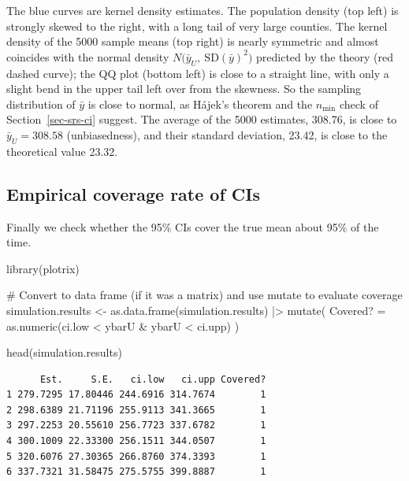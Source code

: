 \documentclass[
  letterpaper,
  DIV=11,
  numbers=noendperiod]{scrreprt}
\newenvironment{Shaded}{\begin{snugshade}}{\end{snugshade}}
\newcommand{\AttributeTok}[1]{\textcolor[rgb]{0.40,0.45,0.13}{#1}}
\newcommand{\CommentTok}[1]{\textcolor[rgb]{0.37,0.37,0.37}{#1}}
\newcommand{\FunctionTok}[1]{\textcolor[rgb]{0.28,0.35,0.67}{#1}}
\newcommand{\NormalTok}[1]{\textcolor[rgb]{0.00,0.23,0.31}{#1}}
\newcommand{\OtherTok}[1]{\textcolor[rgb]{0.00,0.23,0.31}{#1}}
\newcommand{\SpecialCharTok}[1]{\textcolor[rgb]{0.37,0.37,0.37}{#1}}
\newcommand{\StringTok}[1]{\textcolor[rgb]{0.13,0.47,0.30}{#1}}
\renewcommand{\[}{\begin{equation}}
\renewcommand{\]}{\end{equation}}
\begin{document}
The blue curves are kernel density estimates. The population density
(top left) is strongly skewed to the right, with a long tail of very
large counties. The kernel density of the 5000 sample means (top right)
is nearly symmetric and almost coincides with the normal density
\(N\big(\bar y_U,\ \mathrm{SD}(\bar y)^2\big)\) predicted by the theory
(red dashed curve); the QQ plot (bottom left) is close to a straight
line, with only a slight bend in the upper tail left over from the
skewness. So the sampling distribution of \(\bar y\) is close to normal,
as Hájek's theorem and the \(n_{\min}\) check of
Section~\ref{sec-srs-ci} suggest. The average of the 5000 estimates,
308.76, is close to \(\bar y_U = 308.58\) (unbiasedness), and their
standard deviation, 23.42, is close to the theoretical value 23.32.

\subsection{Empirical coverage rate of
CIs}\label{empirical-coverage-rate-of-cis}

Finally we check whether the 95\% CIs cover the true mean about 95\% of
the time.

\begin{Shaded}
\begin{Highlighting}[]
\FunctionTok{library}\NormalTok{(plotrix)}

\CommentTok{\# Convert to data frame (if it was a matrix) and use mutate to evaluate coverage}
\NormalTok{simulation.results }\OtherTok{\textless{}{-}} \FunctionTok{as.data.frame}\NormalTok{(simulation.results) }\SpecialCharTok{|\textgreater{}}
  \FunctionTok{mutate}\NormalTok{(}
    \StringTok{\textasciigrave{}}\AttributeTok{Covered?}\StringTok{\textasciigrave{}} \OtherTok{=} \FunctionTok{as.numeric}\NormalTok{(ci.low }\SpecialCharTok{\textless{}}\NormalTok{ ybarU }\SpecialCharTok{\&}\NormalTok{ ybarU }\SpecialCharTok{\textless{}}\NormalTok{ ci.upp)}
\NormalTok{  )}

\FunctionTok{head}\NormalTok{(simulation.results)}
\end{Highlighting}
\end{Shaded}

\begin{verbatim}
      Est.     S.E.   ci.low   ci.upp Covered?
1 279.7295 17.80446 244.6916 314.7674        1
2 298.6389 21.71196 255.9113 341.3665        1
3 297.2253 20.55610 256.7723 337.6782        1
4 300.1009 22.33300 256.1511 344.0507        1
5 320.6076 27.30365 266.8760 374.3393        1
6 337.7321 31.58475 275.5755 399.8887        1
\end{verbatim}
\end{document}
